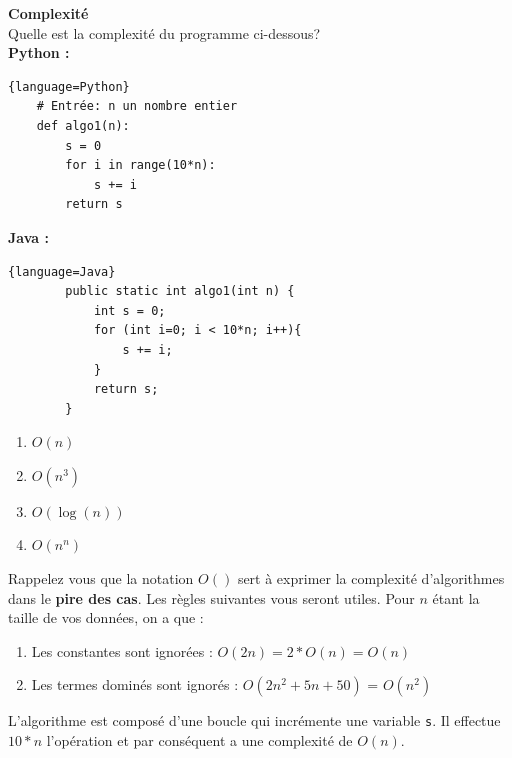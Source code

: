 \begin{Exercice}[10 minutes] \textbf{Complexité} \\

    Quelle est la complexité du programme ci-dessous?\\
    \textbf{Python :}
    \begin{lstlisting}{language=Python}
    # Entrée: n un nombre entier
    def algo1(n):
        s = 0
        for i in range(10*n):
            s += i
        return s
    \end{lstlisting}
    
    \textbf{Java :}
    \begin{lstlisting}{language=Java}
        public static int algo1(int n) {
            int s = 0;
            for (int i=0; i < 10*n; i++){
                s += i;
            }
            return s;
        }
    \end{lstlisting}

    \begin{enumerate}
        \item $O(n)$
        \item $O(n^3)$
        \item $O(\log(n))$
        \item $O(n^n)$
    \end{enumerate}
    
    \begin{conseil}
    Rappelez vous que la notation $O()$ sert à exprimer la complexité d'algorithmes dans le \textbf{pire des cas}. Les règles suivantes vous seront utiles. Pour $n$ étant la taille de vos données, on a que :
    \begin{enumerate}
        \item Les constantes sont ignorées : $O(2n) = 2*O(n) = O(n)$ 
        \item Les termes dominés sont ignorés : $O(2n^2+5n+50)$ = $O(n^2)$
    \end{enumerate}
    \end{conseil}

    \begin{solution}
        L'algorithme est composé d'une boucle qui incrémente une variable \lstinline{s}. Il effectue $10*n$ l'opération et par conséquent a une complexité de $O(n)$.
    \end{solution}
\end{Exercice}
\newpage
